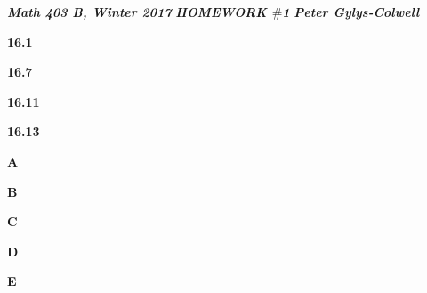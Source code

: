 \documentclass[12pt]{article}
\newenvironment{ques}{\vspace{2 ex}}{\vspace{2 ex}}
\theoremstyle{definition}
\begin{document}
\noindent \textit{\textbf{Math 403 B, Winter 2017}} \hspace{1.3cm}
\textit{\textbf{HOMEWORK $\#$1}} \hspace{1.3cm} \textit{\textbf{Peter
Gylys-Colwell}} 

\vspace{1cm}

\begin{ques}
	\textbf{16.1}
		
\end{ques}

\begin{ques}
	\textbf{16.7}
\end{ques}

\begin{ques}
	\textbf{16.11}
\end{ques}

\begin{ques}
	\textbf{16.13}
\end{ques}

\begin{ques}
	\textbf{A}
		
\end{ques}

\begin{ques}
	\textbf{B}
		
\end{ques}

\begin{ques}
	\textbf{C}
		
\end{ques}

\begin{ques}
	\textbf{D}
\end{ques}

\begin{ques}
	\textbf{E}
\end{ques}
\end{document}
